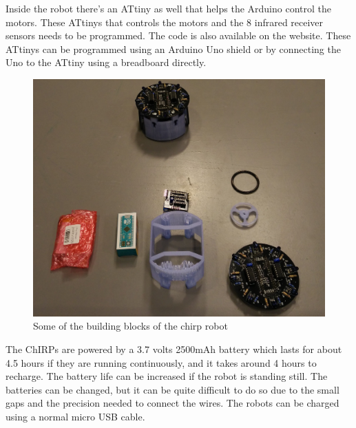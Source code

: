 Inside the robot there's an ATtiny as well that helps the Arduino control the motors. These ATtinys that controls the motors and the 8 infrared receiver sensors needs to be programmed. The code is also available on the website. These ATtinys can be programmed using an Arduino Uno shield or by connecting the Uno to the ATtiny using a breadboard directly.
\begin{figure}[H]
	\centering
	\includegraphics[width=0.8\linewidth]{images/chirpPieces}
	\caption[ChIRP pieces]{Some of the building blocks of the chirp robot}
\end{figure}

The ChIRPs are powered by a 3.7 volts 2500mAh battery which lasts for about 4.5 hours if they are running continuously, and it takes around 4 hours to recharge. The battery life can be increased if the robot is standing still. The batteries can be changed, but it can be quite difficult to do so due to the small gaps and the precision needed to connect the wires. The robots can be charged using a normal micro USB cable.





